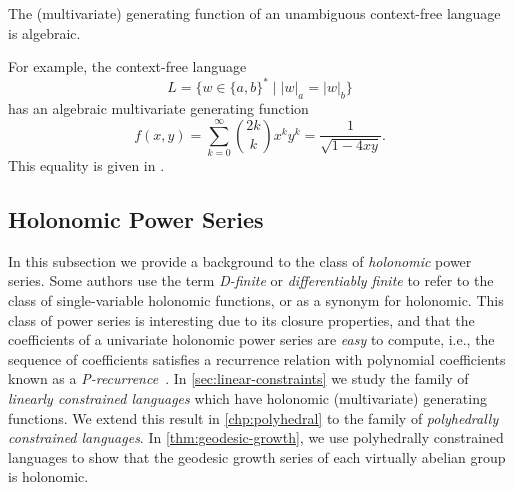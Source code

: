 \begin{lemma}\label{lemma:chomsky-schutzenberger}
	The (multivariate) generating function of an unambiguous context-free language is algebraic.
\end{lemma}

For example, the context-free language
\[
	L = \{w \in \{a,b\}^* \mid |w|_a = |w|_b \}
\]
has an algebraic multivariate generating function
\[
	f(x,y)
	=
	\sum_{k=0}^\infty \binom{2k}{k} x^k y^k
	=
	\frac{1}{\sqrt{1 - 4 x y}}.
\]
This equality is given in \cite[Eq.~(2.5.11) on p.~53]{wilf1994}.

\subsection{Holonomic Power Series}\label{sec:holonomic-functions}

In this subsection we provide a background to the class of \emph{holonomic} power series.
Some authors use the term \emph{D-finite} or \emph{differentiably finite} to refer to the class of single-variable holonomic functions, or as a synonym for holonomic.
This class of power series is interesting due to its closure properties, and that the coefficients of a univariate holonomic power series are \textit{easy} to compute, i.e., the sequence of coefficients satisfies a recurrence relation with polynomial coefficients known as a \emph{P-recurrence}~\cite[748]{flajolet2009}.
In \cref{sec:linear-constraints} we study the family of \emph{linearly constrained languages} which have holonomic (multivariate) generating functions.
We extend this result in \cref{chp:polyhedral} to the family of \emph{polyhedrally constrained languages}.
In \cref{thm:geodesic-growth}, we use polyhedrally constrained languages to show that the geodesic growth series of each virtually abelian group is holonomic.

